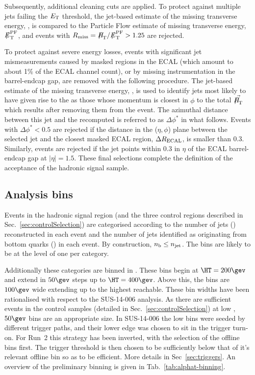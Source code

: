 Subsequently, additional cleaning cuts are applied. To protect against 
multiple jets failing the ${E_{\text T}}$ threshold, the
jet-based estimate of the missing transverse energy, \mht, is compared
to the Particle Flow estimate of missing transverse energy, $\pfmet$,
and events with $R_{\rm miss}=\mht/\pfmet > 1.25$ are rejected.

To protect against severe energy losses, events with significant jet
mismeasurements caused by masked regions in the ECAL (which amount to
about 1\% of the ECAL channel count), or by missing instrumentation in
the barrel-endcap gap, are removed with the following procedure. The
jet-based estimate of the missing transverse energy, \mht, is used to
identify jets most likely to have given rise to the \mht as those
whose momentum is closest in $\phi$ to the total $\vec{\mht}$ which
results after removing them from the event.  The azimuthal distance
between this jet and the recomputed \mht is referred to as
$\Delta\phi^*$ in what follows. Events with $\Delta\phi^* < 0.5$ are
rejected if the distance in the ($\eta,\phi$) plane between the
selected jet and the closest masked ECAL region, $\Delta R_{\rm
  ECAL}$, is smaller than 0.3. Similarly, events are rejected if the
jet points within 0.3 in $\eta$ of the ECAL barrel-endcap gap at
$|\eta| = 1.5$. These final selections complete the definition of the
acceptance of the hadronic signal sample.

\subsection{Analysis bins}

Events in the hadronic signal region (and the
three control regions described in Sec.~\ref{sec:controlSelection}) are
categorised according to the number of jets (\njet) reconstructed in
each event and the number of jets identified as originating from
bottom quarks (\nb) in each event. By construction, $n_{\text{b}} \leq n_{\text{jet}}$. The \njet
bins are likely to be at the level of one \njet per category.

Additionally these categories are binned in \HT. These bins begin at
$\HT=200\gev$ and extend in $50\gev$ steps up to $\HT=400\gev$. Above this, the
bins are $100\gev$ wide extending up to the highest \HT reachable. 
These bin widths have been rationalised with respect to the SUS-14-006 analysis. 
As there are sufficient events in the control
samples (detailed in Sec.~\ref{sec:controlSelection}) at low \HT, $50\gev$ bins
are an appropriate size. In SUS-14-006 the low \HT bins were seeded by different
trigger paths, and their lower edge was chosen to sit in the trigger turn-on. For
Run~2 this strategy has been inverted, with the selection of the offline \HT
bins first. The trigger threshold is then chosen to be sufficiently below that
of it's relevant offline bin so as to be efficient. More details in
Sec~\ref{sec:triggers}. An overview of the preliminary binning is given in Tab.~\ref{tab:alphat-binning}.

